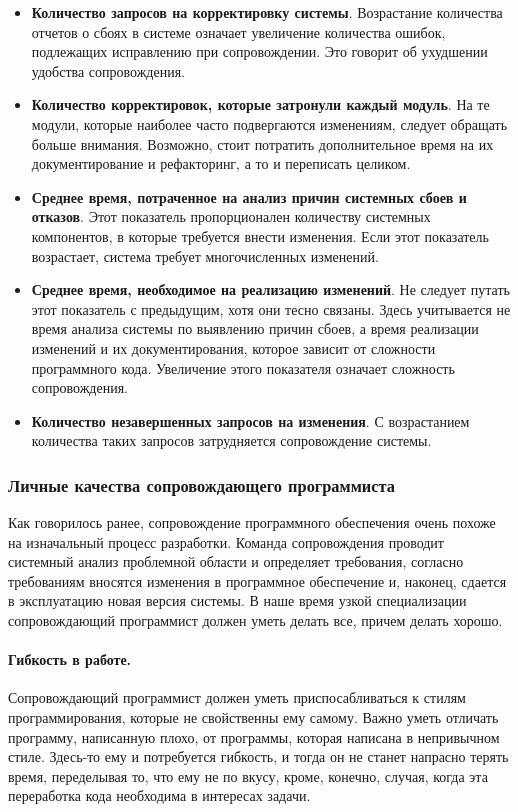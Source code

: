 \documentclass{../../text-style}
\begin{document}
\begin{itemize}
    \item \textbf{Количество запросов на корректировку системы}. Возрастание количества отчетов о сбоях в системе означает увеличение количества ошибок, подлежащих исправлению при сопровождении. Это говорит об ухудшении удобства сопровождения.
    \item \textbf{Количество корректировок, которые затронули каждый модуль}. На те модули, которые наиболее часто подвергаются изменениям, следует обращать больше внимания. Возможно, стоит потратить дополнительное время на их документирование и рефакторинг, а то и переписать целиком.
    \item \textbf{Среднее время, потраченное на анализ причин системных сбоев и отказов}. Этот показатель пропорционален количеству системных компонентов, в которые требуется внести изменения. Если этот показатель возрастает, система требует многочисленных изменений.
    \item \textbf{Среднее время, необходимое на реализацию изменений}. Не следует путать этот показатель с предыдущим, хотя они тесно связаны. Здесь учитывается не время анализа системы по выявлению причин сбоев, а время реализации изменений и их документирования, которое зависит от сложности программного кода. Увеличение этого показателя означает сложность сопровождения.
    \item \textbf{Количество незавершенных запросов на изменения}. С возрастанием количества таких запросов затрудняется сопровождение системы.
\end{itemize}

\subsubsection{Личные качества сопровождающего программиста}

Как говорилось ранее, сопровождение программного обеспечения очень похоже на изначальный процесс разработки. Команда сопровождения проводит системный анализ проблемной области и определяет требования, согласно требованиям вносятся изменения в программное обеспечение и, наконец, сдается в эксплуатацию новая версия системы. В наше время узкой специализации сопровождающий программист должен уметь делать все, причем делать хорошо.

\paragraph{Гибкость в работе.} Сопровождающий программист должен уметь приспосабливаться к стилям программирования, которые не свойственны ему самому. Важно уметь отличать программу, написанную плохо, от программы, которая написана в непривычном стиле. Здесь-то ему и потребуется гибкость, и тогда он не станет напрасно терять время, переделывая то, что ему не по вкусу, кроме, конечно, случая, когда эта переработка кода необходима в интересах задачи.
\end{document}
